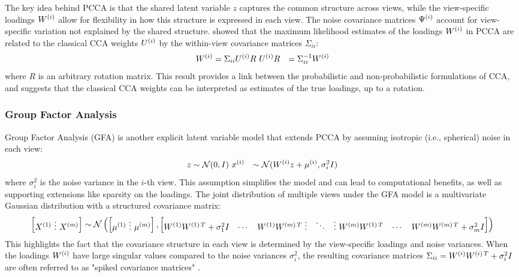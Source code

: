 The key idea behind PCCA is that the shared latent variable $z$ captures the common structure across views, while the view-specific loadings $W^{(i)}$ allow for flexibility in how this structure is expressed in each view. The noise covariance matrices $\Psi^{(i)}$ account for view-specific variation not explained by the shared structure.
\citet{bach2005probabilistic} showed that the maximum likelihood estimates of the loadings $W^{(i)}$ in PCCA are related to the classical CCA weights $U^{(i)}$ by the within-view covariance matrices $\Sigma_{ii}$:
\begin{align}
W^{(i)} &= \Sigma_{ii} U^{(i)} R\
U^{(i)} R &= \Sigma_{ii}^{-1} W^{(i)}
\end{align}
where $R$ is an arbitrary rotation matrix. This result provides a link between the probabilistic and non-probabilistic formulations of CCA, and suggests that the classical CCA weights can be interpreted as estimates of the true loadings, up to a rotation.
\subsubsection{Group Factor Analysis}
Group Factor Analysis (GFA) \citep{klami2014group} is another explicit latent variable model that extends PCCA by assuming isotropic (i.e., spherical) noise in each view:
\begin{align}
z &\sim \mathcal{N}(0, I)\
x^{(i)} &\sim \mathcal{N}(W^{(i)} z + \mu^{(i)}, \sigma_i^2 I)
\end{align}
where $\sigma_i^2$ is the noise variance in the $i$-th view. This assumption simplifies the model and can lead to computational benefits, as well as supporting extensions like sparsity on the loadings.
The joint distribution of multiple views under the GFA model is a multivariate Gaussian distribution with a structured covariance matrix:
\begin{align}
\begin{bmatrix}
X^{(1)} \ \vdots \ X^{(m)}
\end{bmatrix} \sim \mathcal{N} \left( \begin{bmatrix}
\mu^{(1)} \ \vdots \ \mu^{(m)}
\end{bmatrix}, \begin{bmatrix}
W^{(1)}W^{(1)\,T} + \sigma_1^2 I & \cdots & W^{(1)}W^{(m)\,T} \
\vdots & \ddots & \vdots \
W^{(m)}W^{(1)\,T} & \cdots & W^{(m)}W^{(m)\,T} + \sigma_m^2 I
\end{bmatrix} \right)
\end{align}
This highlights the fact that the covariance structure in each view is determined by the view-specific loadings and noise variances. When the loadings $W^{(i)}$ have large singular values compared to the noise variances $\sigma_i^2$, the resulting covariance matrices $\Sigma_{ii} = W^{(i)}W^{(i)\,T} + \sigma_i^2 I$ are often referred to as "spiked covariance matrices" \citep{johnstone2001distribution}.

